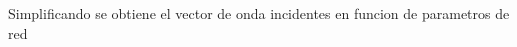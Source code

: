 \documentclass{article}
\begin{document}
\begin{maplegroup}
\mapleresult
\begin{maplelatex}
\end{maplelatex}
\end{maplegroup}
\begin{Maple Normal}{
\begin{Maple Normal}{
Simplificando se obtiene el vector de onda incidentes en funcion de parametros de red}\end{Maple Normal}

}\end{Maple Normal}
\end{document}
